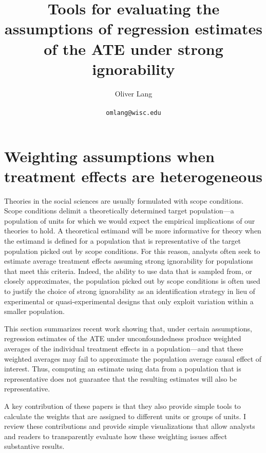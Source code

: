 \documentclass[hidelinks,11pt]{article}
\begin{document}

\setarab
\vocalize
\transtrue
\arabfalse
\title{Tools for evaluating the assumptions of regression estimates of the ATE under strong ignorability}
\author{Oliver Lang \\ \\
\color{darkgray}
	\texttt{omlang@wisc.edu}}
      \maketitle


     
\section{Weighting assumptions when treatment effects are heterogeneous}

Theories in the social sciences are usually formulated with scope conditions. Scope conditions delimit a theoretically determined target population---a population of units for which we would expect the empirical implications of our theories to hold. A theoretical estimand will be more informative for theory when the estimand is defined for a population that is representative of the target population picked out by scope conditions. For this reason, analysts often seek to estimate average treatment effects assuming strong ignorability for populations that meet this criteria. Indeed, the ability to use data that is sampled from, or closely approximates, the population picked out by scope conditions is often used to justify the choice of strong ignorability as an identification strategy in lieu of experimental or quasi-experimental designs that only exploit variation within a smaller population.

This section summarizes recent work showing that, under certain assumptions, regression estimates of the ATE under unconfoundedness produce weighted averages of the individual treatment effects in a population---and that these weighted averages may fail to approximate the population average causal effect of interest. Thus, computing an estimate using data from a population that is representative does not guarantee that the resulting estimates will also be representative.

A key contribution of these papers is that they also provide simple tools to calculate the weights that are assigned to different units or groups of units. I review these contributions and provide simple visualizations that allow analysts and readers to transparently evaluate how these weighting issues affect substantive results. 
\end{document}
